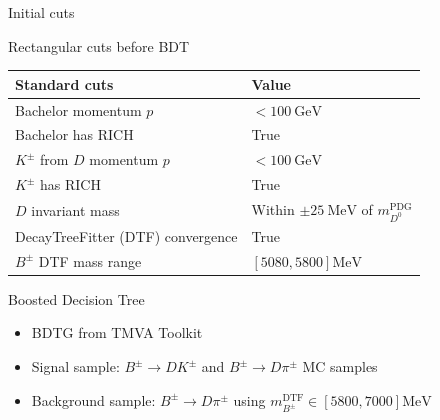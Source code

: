 \documentclass{beamer}
\begin{document}
\begin{frame}{Initial cuts}
  \begin{center}
    Rectangular cuts before BDT
  \end{center}
  \centering
  \def\arraystretch{1.2}%
  \begin{tabular}{|l|l|}
    \hline
    Standard cuts                     & Value \\
    \hline
    Bachelor momentum $p$             & $< \SI{100}{\giga\eV}$ \\
    Bachelor has RICH                 & True \\
    $K^\pm$ from $D$ momentum $p$     & $< \SI{100}{\giga\eV}$ \\
    $K^\pm$ has RICH                  & True \\
    $D$ invariant mass                & Within $\pm\SI{25}{\mega\eV}$ of $m_{D^0}^\text{PDG}$ \\
    DecayTreeFitter (DTF) convergence & True \\
    $B^\pm$ DTF mass range            & $[5080, 5800]\si{\mega\eV}$ \\
    \hline
  \end{tabular}
\end{frame}

\begin{frame}{Boosted Decision Tree}
  \begin{itemize}
    \setlength\itemsep{1.2em}
    \item{BDTG from TMVA Toolkit}
    \item{Signal sample: $B^\pm\to DK^\pm$ and $B^\pm\to D\pi^\pm$ MC samples}
    \item{Background sample: $B^\pm\to D\pi^\pm$ using $m_{B^\pm}^\text{DTF}\in[5800, 7000]\si{\mega\eV}$}
  \end{itemize}
\end{frame}
\end{document}
